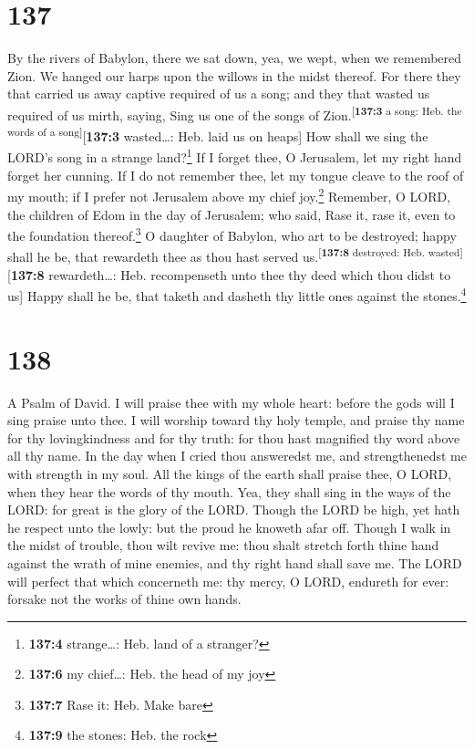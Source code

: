 \hypertarget{section-138}{%
\section{137}\label{section-138}}

 By the rivers of Babylon, there we sat down, yea, we
wept, when we remembered Zion.  We hanged our harps upon
the willows in the midst thereof.  For there they that
carried us away captive required of us a song; and they that wasted us
required of us mirth, saying, Sing us one of the songs of
Zion.\textsuperscript{{[}\textbf{137:3} a song: Heb. the words of a
song{]}}{[}\textbf{137:3} wasted\ldots: Heb. laid us on heaps{]}
 How shall we sing the LORD's song in a strange
land?\footnote{\textbf{137:4} strange\ldots: Heb. land of a stranger?}
 If I forget thee, O Jerusalem, let my right hand forget
her cunning.  If I do not remember thee, let my tongue
cleave to the roof of my mouth; if I prefer not Jerusalem above my chief
joy.\footnote{\textbf{137:6} my chief\ldots: Heb. the head of my joy}
 Remember, O LORD, the children of Edom in the day of
Jerusalem; who said, Rase it, rase it, even to the foundation
thereof.\footnote{\textbf{137:7} Rase it: Heb. Make bare} 
O daughter of Babylon, who art to be destroyed; happy shall he be, that
rewardeth thee as thou hast served us.\textsuperscript{{[}\textbf{137:8}
destroyed: Heb. wasted{]}}{[}\textbf{137:8} rewardeth\ldots: Heb.
recompenseth unto thee thy deed which thou didst to us{]} 
Happy shall he be, that taketh and dasheth thy little ones against the
stones.\footnote{\textbf{137:9} the stones: Heb. the rock}

\hypertarget{section-139}{%
\section{138}\label{section-139}}

A Psalm of David.  I will praise thee with my whole heart:
before the gods will I sing praise unto thee.  I will
worship toward thy holy temple, and praise thy name for thy
lovingkindness and for thy truth: for thou hast magnified thy word above
all thy name.  In the day when I cried thou answeredst me,
and strengthenedst me with strength in my soul.  All the
kings of the earth shall praise thee, O LORD, when they hear the words
of thy mouth.  Yea, they shall sing in the ways of the
LORD: for great is the glory of the LORD.  Though the LORD
be high, yet hath he respect unto the lowly: but the proud he knoweth
afar off.  Though I walk in the midst of trouble, thou
wilt revive me: thou shalt stretch forth thine hand against the wrath of
mine enemies, and thy right hand shall save me.  The LORD
will perfect that which concerneth me: thy mercy, O LORD, endureth for
ever: forsake not the works of thine own hands.

